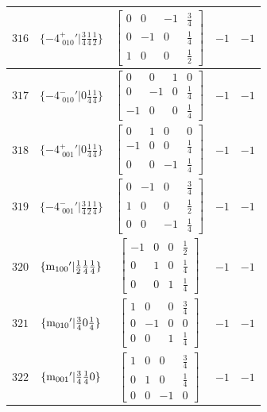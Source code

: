 \documentclass[fleqn,8pt]{jsarticle}
\begin{document}
\begin{longtable}{ccccc}
$ 316 $ & $ \{-4^{+}_{\,\,010}{}'|\frac{3}{4} \frac{1}{4} \frac{1}{2}\} $ & $ \begin{bmatrix} 0 & 0 & -1 & \frac{3}{4} \\ 0 & -1 & 0 & \frac{1}{4} \\ 1 & 0 & 0 & \frac{1}{2} \end{bmatrix} $ & $ -1 $ & $ -1 $ \\ \hline
$ 317 $ & $ \{-4^{-}_{\,\,010}{}'|0 \frac{1}{4} \frac{1}{4}\} $ & $ \begin{bmatrix} 0 & 0 & 1 & 0 \\ 0 & -1 & 0 & \frac{1}{4} \\ -1 & 0 & 0 & \frac{1}{4} \end{bmatrix} $ & $ -1 $ & $ -1 $ \\ \hline
$ 318 $ & $ \{-4^{+}_{\,\,001}{}'|0 \frac{1}{4} \frac{1}{4}\} $ & $ \begin{bmatrix} 0 & 1 & 0 & 0 \\ -1 & 0 & 0 & \frac{1}{4} \\ 0 & 0 & -1 & \frac{1}{4} \end{bmatrix} $ & $ -1 $ & $ -1 $ \\ \hline
$ 319 $ & $ \{-4^{-}_{\,\,001}{}'|\frac{3}{4} \frac{1}{2} \frac{1}{4}\} $ & $ \begin{bmatrix} 0 & -1 & 0 & \frac{3}{4} \\ 1 & 0 & 0 & \frac{1}{2} \\ 0 & 0 & -1 & \frac{1}{4} \end{bmatrix} $ & $ -1 $ & $ -1 $ \\ \hline
$ 320 $ & $ \{{\rm m}_{100}{}'|\frac{1}{2} \frac{1}{4} \frac{1}{4}\} $ & $ \begin{bmatrix} -1 & 0 & 0 & \frac{1}{2} \\ 0 & 1 & 0 & \frac{1}{4} \\ 0 & 0 & 1 & \frac{1}{4} \end{bmatrix} $ & $ -1 $ & $ -1 $ \\ \hline
$ 321 $ & $ \{{\rm m}_{010}{}'|\frac{3}{4} 0 \frac{1}{4}\} $ & $ \begin{bmatrix} 1 & 0 & 0 & \frac{3}{4} \\ 0 & -1 & 0 & 0 \\ 0 & 0 & 1 & \frac{1}{4} \end{bmatrix} $ & $ -1 $ & $ -1 $ \\ \hline
$ 322 $ & $ \{{\rm m}_{001}{}'|\frac{3}{4} \frac{1}{4} 0\} $ & $ \begin{bmatrix} 1 & 0 & 0 & \frac{3}{4} \\ 0 & 1 & 0 & \frac{1}{4} \\ 0 & 0 & -1 & 0 \end{bmatrix} $ & $ -1 $ & $ -1 $ \\ \hline

\end{longtable}
\end{document}
